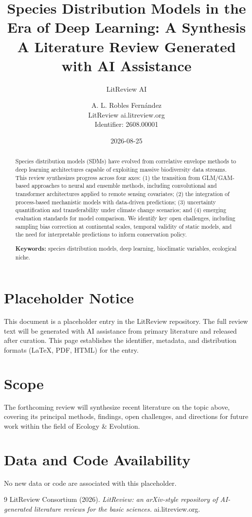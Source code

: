 \documentclass[11pt]{article}
\title{Species Distribution Models in the Era of Deep Learning: A Synthesis\\
\large A Literature Review Generated with AI Assistance}
\author{LitReview AI \and A. L. Robles Fernández\\[4pt]
\small LitReview \textbar{} ai.litreview.org\\
\small Identifier: 2608.00001}
\date{2026-08-25}
\begin{document}
\maketitle

\begin{abstract}
Species distribution models (SDMs) have evolved from correlative envelope methods to deep learning architectures capable of exploiting massive biodiversity data streams. This review synthesizes progress across four axes: (1) the transition from GLM/GAM-based approaches to neural and ensemble methods, including convolutional and transformer architectures applied to remote sensing covariates; (2) the integration of process-based mechanistic models with data-driven predictions; (3) uncertainty quantification and transferability under climate change scenarios; and (4) emerging evaluation standards for model comparison. We identify key open challenges, including sampling bias correction at continental scales, temporal validity of static models, and the need for interpretable predictions to inform conservation policy.

\noindent\textbf{Keywords:} species distribution models, deep learning, bioclimatic variables, ecological niche.
\end{abstract}

\section*{Placeholder Notice}
This document is a placeholder entry in the LitReview repository. The full
review text will be generated with AI assistance from primary literature and
released after curation. This page establishes the identifier, metadata, and
distribution formats (LaTeX, PDF, HTML) for the entry.

\section*{Scope}
The forthcoming review will synthesize recent literature on the topic above,
covering its principal methods, findings, open challenges, and directions for
future work within the field of Ecology \& Evolution.

\section*{Data and Code Availability}
No new data or code are associated with this placeholder.


\begin{thebibliography}{9}
 LitReview Consortium (2026). \emph{LitReview: an arXiv-style repository of AI-generated literature reviews for the basic sciences.} ai.litreview.org.
\end{thebibliography}
\end{document}
